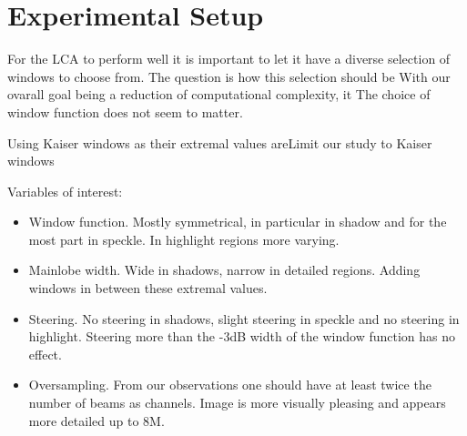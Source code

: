 \documentclass[10pt,journal,draftclsnofoot,onecolumn]{IEEEtran}
\newcommand\1{\vec 1}
\begin{document}
% 

\section{Experimental Setup}

For the LCA to perform well it is important to let it have a diverse selection of windows to choose from. The question is how this selection should be With our ovarall goal being a reduction of computational complexity, it The choice of window function does not seem to matter. 

Using Kaiser windows as their extremal values areLimit our study to Kaiser windows

Variables of interest:
\begin{itemize}
\item Window function. Mostly symmetrical, in particular in shadow and for the most part in speckle. In highlight regions more varying.
\item Mainlobe width. Wide in shadows, narrow in detailed regions. Adding windows in between these extremal values.
\item Steering. No steering in shadows, slight steering in speckle and no steering in highlight. Steering more than the -3dB width of the window function has no effect.
\item Oversampling. From our observations one should have at least twice the number of beams as channels. Image is more visually pleasing and appears more detailed up to 8M.
\end{itemize}
\end{document}
